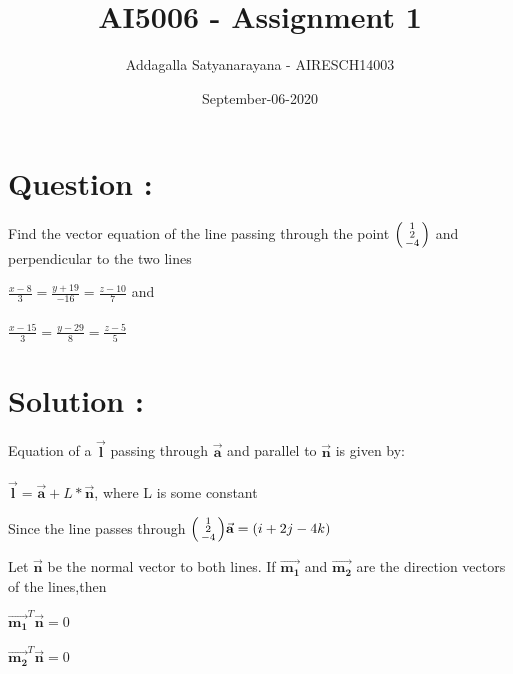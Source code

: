 \documentclass{article}
\title{AI5006 - Assignment 1}
\author{Addagalla Satyanarayana - AIRESCH14003 }
\date{September-06-2020}
\begin{document}
	\maketitle
	\section*{Question :}

{\Large Find the vector equation of the line passing through the point 	
$\begin{psmallmatrix}1 \\2 \\-4	\end{psmallmatrix}$
and perpendicular to the two lines

$\frac{x-8}{3} = \frac{y+19}{-16}= \frac{z-10}{7} $ and\\\\
$\frac{x-15}{3} = \frac{y-29}{8}= \frac{z-5}{5} $\\

\section*{Solution :}

Equation of a $\vec{\textbf{l}}$ passing through $\vec{\textbf{a}}$ and parallel to  $\vec{\textbf{n}}$ is given by:\\\\
$\vec{\textbf{l}} =\vec{\textbf{a}} + L*\vec{\textbf{n}} $, where L is some constant

Since the line passes through $\begin{psmallmatrix}	1 \\2 \\-4\end{psmallmatrix} \\
\vec{\textbf{a}} = (i + 2j - 4k)$

Let $\vec{\textbf{n}}$ be the normal vector to both lines. If $\vec{\textbf{m}_\textbf{1}}$ and $\vec{\textbf{m}_\textbf{2}}$ are the direction vectors of the lines,then

$\vec{\textbf{m}_\textbf{1}}^T\vec{\textbf{n}} = 0$

$\vec{\textbf{m}_\textbf{2}}^T\vec{\textbf{n}} = 0$

}
\end{document}
